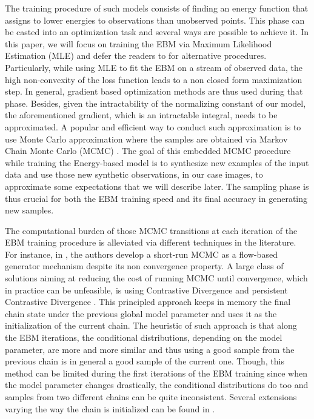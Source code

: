 \documentclass{article}
\begin{document}
The training procedure of such models consists of finding an energy function that assigns to lower energies to observations than unobserved points.
This phase can be casted into an optimization task and several ways are possible to achieve it.
In this paper, we will focus on training the EBM via Maximum Likelihood Estimation (MLE) and defer the readers to \citep{song2021train} for alternative procedures.
Particularly, while using MLE to fit the EBM on a stream of observed data, the high non-convexity of the loss function leads to a non closed form maximization step. In general, gradient based optimization methods are thus used during that phase.
Besides, given the intractability of the normalizing constant of our model, the aforementioned gradient, which is an intractable integral, needs to be approximated.
A popular and efficient way to conduct such approximation is to use Monte Carlo approximation where the samples are obtained via Markov Chain Monte Carlo (MCMC) \citep{meyn2012markov}.
The goal of this embedded MCMC procedure while training the Energy-based model is to synthesize new examples of the input data and use those new synthetic observations, in our case images, to approximate some expectations that we will describe later.
The sampling phase is thus crucial for both the EBM training speed and its final accuracy in generating new samples.

The computational burden of those MCMC transitions at each iteration of the EBM training procedure is alleviated via different techniques in the literature.
For instance, in \citep{nijkamp2019learning}, the authors develop a short-run MCMC as a flow-based generator mechanism despite its non convergence property.
A large class of solutions aiming at reducing the cost of running MCMC until convergence, which in practice can be unfeasible, is using Contrastive Divergence \citep{hinton2002training} and persistent Contrastive Divergence \citep{tieleman2008training}.
This principled approach keeps in memory the final chain state under the previous global model parameter and uses it as the initialization of the current chain.
The heuristic of such approach is that along the EBM iterations, the conditional distributions, depending on the model parameter, are more and more similar and thus using a good sample from the previous chain is in general a good sample of the current one.
Though, this method can be limited during the first iterations of the EBM training since when the model parameter changes drastically, the conditional distributions do too and samples from two different chains can be quite inconsistent.
Several extensions varying the way the chain is initialized can be found in \citep{welling2002new,gao2018learning,du2019implicit}.
\end{document}

